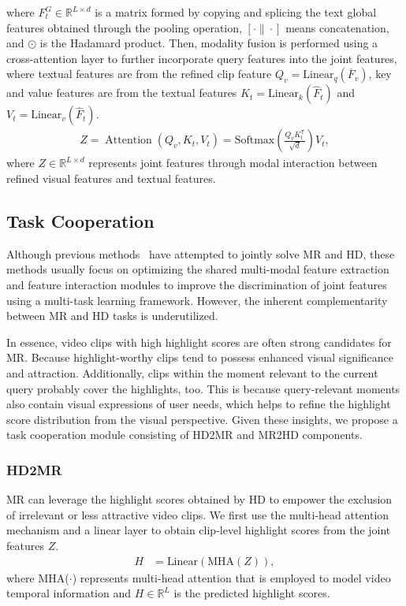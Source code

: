 where $F_t^G \in \mathbb{R}^{L \times d}$ is a matrix formed by copying and splicing the text global features obtained through the pooling operation, $\left[ \cdot\|\cdot\right]$ means concatenation, and $\odot$ is the Hadamard product.
Then, modality fusion is performed using a cross-attention layer to further incorporate query features into the joint features, where textual features are from the refined clip feature $Q_{v} = \text{Linear}_q(\overline{F}_v)$, key and value features are from the textual features $K_t=\text{Linear}_k(\widehat{F}_t)$ and $V_t=\text{Linear}_v(\widehat{F}_t)$.
\begin{align}
    Z = \operatorname{Attention}(Q_v, K_t, V_t) = \text{Softmax}\left(\frac{Q_v K_t^{\mathsf{T}}}{\sqrt{d}}\right) V_t,
\end{align}
where $Z \in\mathbb{R}^{L\times d} $ represents joint features through modal interaction between refined visual features and textual features.

\subsection{Task Cooperation}
Although previous methods~\cite{lei2021detecting,liu2022umt,moon2023query}  have attempted to jointly solve MR and HD, these methods usually focus on optimizing the shared multi-modal feature extraction and feature interaction modules to improve the discrimination of joint features using a multi-task learning framework. However, the inherent complementarity between MR and HD tasks is underutilized.

In essence, video clips with high highlight scores are often strong candidates for MR. Because highlight-worthy clips tend to possess enhanced visual significance and attraction. Additionally, clips within the moment relevant to the current query probably cover the highlights, too.
This is because query-relevant moments also contain visual expressions of user needs, which helps to refine the highlight score distribution from the visual perspective. Given these insights, we propose a task cooperation module consisting of HD2MR and MR2HD components.

\subsubsection{HD2MR}
MR can leverage the highlight scores obtained by HD to empower the exclusion of irrelevant or less attractive video clips. We first use the multi-head attention mechanism and a linear layer to obtain clip-level highlight scores from the joint features $Z$.
\begin{align}
    H &= \text{Linear}(\text{MHA}(Z)),
\end{align}
where MHA($\cdot$) represents multi-head attention that is employed to model video temporal information and $H \in\mathbb{R}^L$ is the predicted highlight scores.

